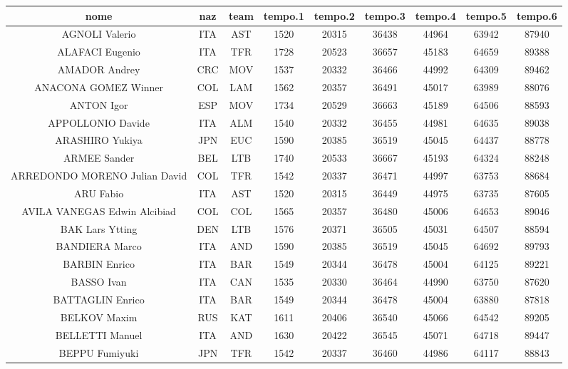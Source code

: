 \documentclass[8pt]{article}
\begin{document}
\begin{table}[h]
\centering
\begin{tabular}{|c|c|c|c|c|c|c|c|c|}
\hline
nome &naz & team & tempo.1 & tempo.2 & tempo.3 & tempo.4 & tempo.5 & tempo.6\\ \hline
AGNOLI Valerio &ITA & AST & 1520 & 20315 & 36438 & 44964 & 63942 & 87940\\ \hline
ALAFACI Eugenio &ITA & TFR & 1728 & 20523 & 36657 & 45183 & 64659 & 89388\\ \hline
AMADOR Andrey &CRC & MOV & 1537 & 20332 & 36466 & 44992 & 64309 & 89462\\ \hline
ANACONA GOMEZ Winner &COL & LAM & 1562 & 20357 & 36491 & 45017 & 63989 & 88076\\ \hline
ANTON Igor &ESP & MOV & 1734 & 20529 & 36663 & 45189 & 64506 & 88593\\ \hline
APPOLLONIO Davide &ITA & ALM & 1540 & 20332 & 36455 & 44981 & 64635 & 89038\\ \hline
ARASHIRO Yukiya &JPN & EUC & 1590 & 20385 & 36519 & 45045 & 64437 & 88778\\ \hline
ARMEE Sander &BEL & LTB & 1740 & 20533 & 36667 & 45193 & 64324 & 88248\\ \hline
ARREDONDO MORENO Julian David &COL & TFR & 1542 & 20337 & 36471 & 44997 & 63753 & 88684\\ \hline
ARU Fabio &ITA & AST & 1520 & 20315 & 36449 & 44975 & 63735 & 87605\\ \hline
AVILA VANEGAS Edwin Alcibiad &COL & COL & 1565 & 20357 & 36480 & 45006 & 64653 & 89046\\ \hline
BAK Lars Ytting &DEN & LTB & 1576 & 20371 & 36505 & 45031 & 64507 & 88594\\ \hline
BANDIERA Marco &ITA & AND & 1590 & 20385 & 36519 & 45045 & 64692 & 89793\\ \hline
BARBIN Enrico &ITA & BAR & 1549 & 20344 & 36478 & 45004 & 64125 & 89221\\ \hline
BASSO Ivan &ITA & CAN & 1535 & 20330 & 36464 & 44990 & 63750 & 87620\\ \hline
BATTAGLIN Enrico &ITA & BAR & 1549 & 20344 & 36478 & 45004 & 63880 & 87818\\ \hline
BELKOV Maxim &RUS & KAT & 1611 & 20406 & 36540 & 45066 & 64542 & 89205\\ \hline
BELLETTI Manuel &ITA & AND & 1630 & 20422 & 36545 & 45071 & 64718 & 89447\\ \hline
BEPPU Fumiyuki &JPN & TFR & 1542 & 20337 & 36460 & 44986 & 64117 & 88843\\ \hline

\end{tabular}
\end{table}
\end{document}
